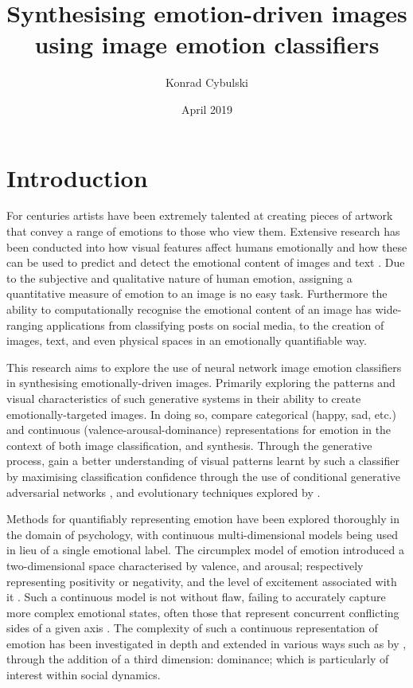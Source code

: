 \documentclass{article}
\title{Synthesising emotion-driven images using image emotion classifiers}
\author{Konrad Cybulski}
\date{April 2019}
\begin{document}
	
\maketitle

\section{Introduction}

For centuries artists have been extremely talented at creating pieces of artwork that convey a range of emotions to those who view them.
Extensive research has been conducted into how visual features affect humans emotionally and how these can be used to predict and detect the emotional content of images and text \citep{machajdik2010affective, zhao2014exploring}.
Due to the subjective and qualitative nature of human emotion, assigning a quantitative measure of emotion to an image is no easy task.
Furthermore the ability to computationally recognise the emotional content of an image has wide-ranging applications from classifying posts on social media, to the creation of images, text, and even physical spaces in an emotionally quantifiable way.

This research aims to explore the use of neural network image emotion classifiers in synthesising emotionally-driven images.
Primarily exploring the patterns and visual characteristics of such generative systems in their ability to create emotionally-targeted images.
In doing so, compare categorical (happy, sad, etc.) and continuous (valence-arousal-dominance) representations for emotion in the context of both image classification, and synthesis.
Through the generative process, gain a better understanding of visual patterns learnt by such a classifier by maximising classification confidence through the use of conditional generative adversarial networks \citep{gauthier2014conditional}, and evolutionary techniques explored by \citep{nguyen2015deep}.

Methods for quantifiably representing emotion have been explored thoroughly in the domain of psychology, with continuous multi-dimensional models being used in lieu of a single emotional label.
The circumplex model of emotion introduced a two-dimensional space characterised by valence, and arousal; respectively representing positivity or negativity, and the level of excitement associated with it \citep{russell1980circumplex}.
Such a continuous model is not without flaw, failing to accurately capture more complex emotional states, often those that represent concurrent conflicting sides of a given axis \citep{larsen1992promises}.
The complexity of such a continuous representation of emotion has been investigated in depth and extended in various ways such as by \citet{bradley1994measuring}, through the addition of a third dimension: dominance; which is particularly of interest within social dynamics.
\end{document}
